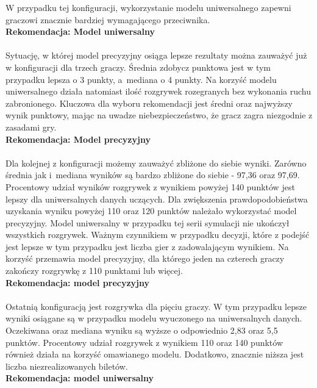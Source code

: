 \documentclass[12pt, oneside]{report}
\begin{document}
W przypadku tej konfiguracji, wykorzystanie modelu uniwersalnego zapewni graczowi znacznie bardziej wymagającego przeciwnika.
\\
\textbf{Rekomendacja: Model uniwersalny} \\ \\ 
Sytuację, w której model precyzyjny osiąga lepsze rezultaty można zauważyć już w konfiguracji dla trzech graczy. Średnia zdobycz punktowa jest w tym przypadku lepsza o 3 punkty, a~mediana o 4 punkty. Na korzyść modelu uniwersalnego działa natomiast ilość rozgrywek rozegranych bez wykonania ruchu zabronionego. Kluczowa dla wyboru rekomendacji jest średni oraz najwyższy wynik punktowy, mając na uwadze niebezpieczeństwo, że gracz zagra niezgodnie z zasadami gry.
 \\
\textbf{Rekomendacja: Model precyzyjny} \\ \\
Dla kolejnej z konfiguracji możemy zauważyć zbliżone do siebie wyniki. Zarówno średnia jak i~mediana wyników są bardzo zbliżone do siebie - 97,36 oraz 97,69. Procentowy udział wyników rozgrywek z wynikiem powyżej 140 punktów jest lepszy dla uniwersalnych danych uczących. Dla zwiększenia prawdopodobieństwa uzyskania wyniku powyżej 110 oraz 120 punktów należało wykorzystać model precyzyjny. Model uniwersalny w przypadku tej serii symulacji nie ukończył wszystkich rozgrywek. Ważnym czynnikiem w przypadku decyzji, które z podejść jest lepsze w tym przypadku jest liczba gier z zadowalającym wynikiem. Na korzyść przemawia model precyzyjny, dla którego jeden na czterech graczy zakończy rozgrywkę z 110 punktami lub więcej.
\\ \textbf{Rekomendacja: model precyzyjny} \\ \\ 
Ostatnią konfiguracją jest rozgrywka dla pięciu graczy. W tym przypadku lepsze wyniki osiągane są w przypadku modelu wyuczonego na uniwersalnych danych. Oczekiwana oraz mediana wyniku są wyższe o odpowiednio 2,83 oraz 5,5 punktów. Procentowy udział rozgrywek z wynikiem 110 oraz 140 punktów również działa na korzyść omawianego modelu. Dodatkowo, znacznie niższa jest liczba niezrealizowanych biletów. \\ \textbf{Rekomendacja: model uniwersalny} \\ \\
\end{document}
